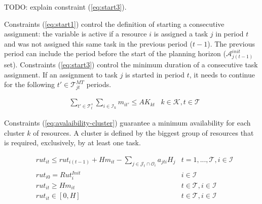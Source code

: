\documentclass[a4paper,onecolumn,fleqn]{article}
\begin{document}
    TODO: explain constraint (\ref{eq:start3}).

    Constraints (\ref{eq:start1}) control the definition of starting a consecutive assignment: the variable is active if a resource $i$ is assigned a task $j$ in period $t$ and was not assigned this same task in the previous period ($t-1$). The previous period can include the period before the start of the planning horizon ($\mathcal{A}^{init}_{j(t-1)}$ set).
    Constraints (\ref{eq:start3}) control the minimum duration of a consecutive task assignment. If an assignment to task $j$ is started in period $t$, it needs to continue for the following $t' \in \mathcal{T}^{MT}_{jt}$ periods.

    \begin{align}
       & \sum_{t' \in \mathcal{T}^{s}_t} \sum_{i \in \mathcal{I}_k} m_{it'} \leq AK_{kt}
        &k \in \mathcal{K}, t \in \mathcal{T} \label{eq:avalaibility-cluster}
    \end{align}

    Constraints (\ref{eq:avalaibility-cluster}) guarantee a minimum availability for each cluster $k$ of resources. A cluster is defined by the biggest group of resources that is required, exclusively, by at least one task.

    \begin{align}
         & rut_{it} \leq rut_{i(t-1)} + H m_{it} - \sum_{j \in \mathcal{J}_t \cap \mathcal{O}_i} a_{jti} H_j & t =1, ..., \mathcal{T}, i \in \mathcal{I} \label{eq:rut_upper}\\
        & rut_{i0} = Rut^{Init}_i
               & i \in \mathcal{I} \label{eq:rut_initial}\\
        & rut_{it} \geq H m_{it}
                & t \in \mathcal{T}, i \in \mathcal{I}\label{eq:rut_lower}\\ 
        & rut_{it} \in [0,H]
                & t \in \mathcal{T}, i \in \mathcal{I} \label{eq:mu}              
    \end{align}
\end{document}
